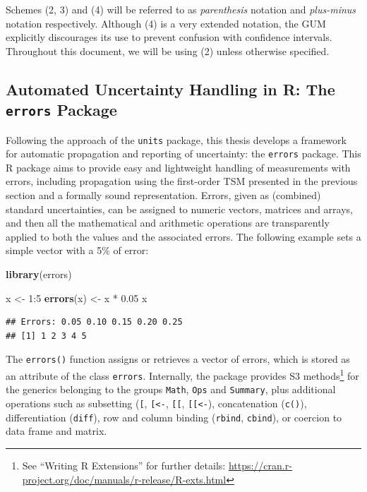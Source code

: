 \documentclass[twoside,nohyper]{tufte-book}
\newenvironment{Shaded}{}{}
\newcommand{\DecValTok}[1]{\textcolor[rgb]{0.25,0.63,0.44}{#1}}
\newcommand{\FloatTok}[1]{\textcolor[rgb]{0.25,0.63,0.44}{#1}}
\newcommand{\KeywordTok}[1]{\textcolor[rgb]{0.00,0.44,0.13}{\textbf{#1}}}
\newcommand{\NormalTok}[1]{#1}
\newcommand{\OperatorTok}[1]{\textcolor[rgb]{0.40,0.40,0.40}{#1}}
\newcommand{\StringTok}[1]{\textcolor[rgb]{0.25,0.44,0.63}{#1}}
\theoremstyle{definition}
\theoremstyle{definition}
\theoremstyle{definition}
\theoremstyle{remark}
\begin{document}
Schemes (2, 3) and (4) will be referred to as \emph{parenthesis}
notation and \emph{plus-minus} notation respectively. Although (4) is a
very extended notation, the GUM explicitly discourages its use to
prevent confusion with confidence intervals. Throughout this document,
we will be using (2) unless otherwise specified.

\hypertarget{automated-uncertainty-handling-in-r-the-errors-package}{%
\subsection{\texorpdfstring{Automated Uncertainty Handling in R: The
\texttt{errors}
Package}{Automated Uncertainty Handling in R: The errors Package}}\label{automated-uncertainty-handling-in-r-the-errors-package}}

Following the approach of the \texttt{units} package, this thesis
develops a framework for automatic propagation and reporting of
uncertainty: the \texttt{errors}
package\cite[0pt]{R-errors}.
This R package aims to provide easy and lightweight handling of
measurements with errors, including propagation using the first-order
TSM presented in the previous section and a formally sound
representation. Errors, given as (combined) standard uncertainties, can
be assigned to numeric vectors, matrices and arrays, and then all the
mathematical and arithmetic operations are transparently applied to both
the values and the associated errors. The following example sets a
simple vector with a 5\% of error:

\begin{Shaded}
\begin{Highlighting}[]
\KeywordTok{library}\NormalTok{(errors)}

\NormalTok{x <-}\StringTok{ }\DecValTok{1}\OperatorTok{:}\DecValTok{5}
\KeywordTok{errors}\NormalTok{(x) <-}\StringTok{ }\NormalTok{x }\OperatorTok{*}\StringTok{ }\FloatTok{0.05}
\NormalTok{x}
\end{Highlighting}
\end{Shaded}

\begin{verbatim}
## Errors: 0.05 0.10 0.15 0.20 0.25
## [1] 1 2 3 4 5
\end{verbatim}

The \texttt{errors()} function assigns or retrieves a vector of errors,
which is stored as an attribute of the class \texttt{errors}.
Internally, the package provides S3 methods\footnote{See ``Writing R
  Extensions'' for further details:
  \url{https://cran.r-project.org/doc/manuals/r-release/R-exts.html}}
for the generics belonging to the groups \texttt{Math}, \texttt{Ops} and
\texttt{Summary}, plus additional operations such as subsetting
(\texttt{{[}}, \texttt{{[}\textless{}-}, \texttt{{[}{[}},
\texttt{{[}{[}\textless{}-}), concatenation (\texttt{c()}),
differentiation (\texttt{diff}), row and column binding (\texttt{rbind},
\texttt{cbind}), or coercion to data frame and matrix.
\end{document}
